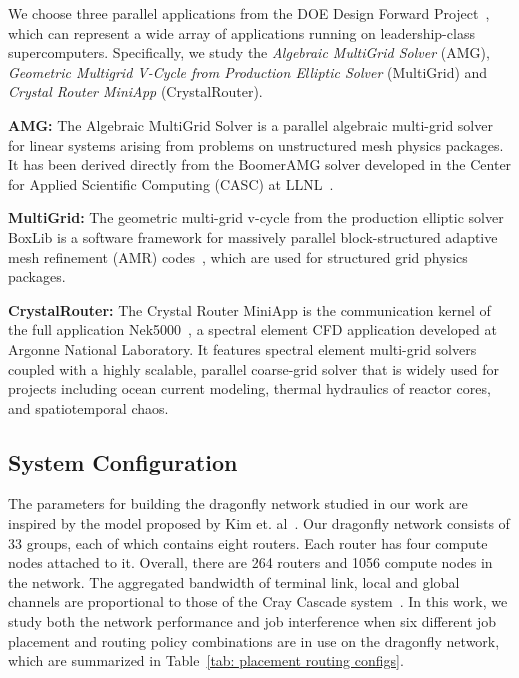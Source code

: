 We choose three parallel applications from the DOE Design Forward Project~\cite{designforwardwebpage}, which can represent a wide array of applications running on leadership-class supercomputers. Specifically, we study the \emph{Algebraic MultiGrid Solver} (AMG), \emph{Geometric Multigrid V-Cycle from Production Elliptic Solver} (MultiGrid) and \emph{Crystal Router MiniApp} (CrystalRouter). 

\textbf{AMG:} The Algebraic MultiGrid Solver is a parallel algebraic multi-grid solver for linear systems arising from problems on unstructured mesh physics packages. It has been derived directly from the BoomerAMG solver developed in the Center for Applied Scientific Computing (CASC) at LLNL~\cite{amg}. 


\textbf{MultiGrid:} The geometric multi-grid v-cycle from the production elliptic solver BoxLib is a software framework for massively parallel block-structured adaptive mesh refinement (AMR) codes~\cite{boxlib}, which are used for structured grid physics packages. 

\textbf{CrystalRouter:} The Crystal Router MiniApp is the communication kernel of the full application Nek5000~\cite{nek5000}, a spectral element CFD application developed at Argonne National Laboratory. It features spectral element multi-grid solvers coupled with a highly scalable, parallel coarse-grid solver that is widely used for projects including ocean current modeling, thermal hydraulics of reactor cores, and spatiotemporal chaos. 




\subsection{System Configuration}
\label{sec: simulation configuration}

The parameters for building the dragonfly network studied in our work are inspired by the model proposed by Kim et. al~\cite{kim-micro}. Our dragonfly network consists of 33 groups, each of which contains eight routers. Each router has four compute nodes attached to it. Overall, there are 264 routers and 1056 compute nodes in the network. The aggregated bandwidth of terminal link,  local and global channels are proportional to those of the Cray Cascade system~\cite{faanes}. In this work, we study both the network performance and job interference when six different job placement and routing policy combinations are in use on the dragonfly network, which are summarized in Table~\ref{tab: placement routing configs}. 

